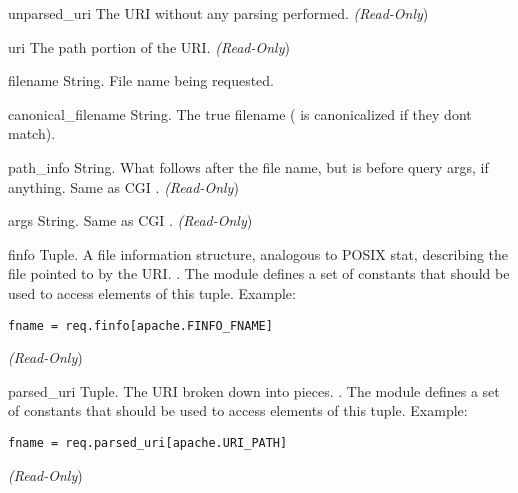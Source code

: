 \begin{memberdesc}[Request]{unparsed_uri}
The URI without any parsing performed.
\emph{(Read-Only})
\end{memberdesc}

\begin{memberdesc}[Request]{uri}
The path portion of the URI.
\emph{(Read-Only})
\end{memberdesc}

\begin{memberdesc}[Request]{filename}
String. File name being requested.
\end{memberdesc}

\begin{memberdesc}[Request]{canonical_filename}
String. The true filename ( is canonicalized if
they dont match).  
\end{memberdesc}

\begin{memberdesc}[Request]{path_info}
String. What follows after the file name, but is before query args, if
anything. Same as CGI .
\emph{(Read-Only})
\end{memberdesc}

\begin{memberdesc}[Request]{args}
String. Same as CGI .
\emph{(Read-Only})
\end{memberdesc}

\begin{memberdesc}[Request]{finfo}
Tuple. A file information structure, analogous to POSIX stat,
describing the file pointed to by the URI.  . The  module defines a set of 
constants that should be used to access elements of this
tuple. Example:
\begin{verbatim}
fname = req.finfo[apache.FINFO_FNAME]
\end{verbatim}
\emph{(Read-Only})
\end{memberdesc}

\begin{memberdesc}[Request]{parsed_uri}
Tuple. The URI broken down into pieces.
. 
The  module defines a set of  constants that
should be used to access elements of this tuple. Example:
\begin{verbatim}
fname = req.parsed_uri[apache.URI_PATH]
\end{verbatim}
\emph{(Read-Only})
\end{memberdesc}

